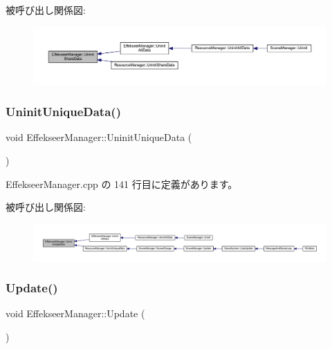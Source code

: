被呼び出し関係図\+:
\nopagebreak
\begin{figure}[H]
\begin{center}
\leavevmode
\includegraphics[width=350pt]{class_effekseer_manager_ab83021d09eeeaba41852c8db2f07fe55_icgraph}
\end{center}
\end{figure}
\mbox{\label{class_effekseer_manager_abd448f6ec39f2306a6dc99b79aff0362}} 
\subsubsection{\texorpdfstring{Uninit\+Unique\+Data()}{UninitUniqueData()}}
{\footnotesize\ttfamily void Effekseer\+Manager\+::\+Uninit\+Unique\+Data (\begin{DoxyParamCaption}{ }\end{DoxyParamCaption})\hspace{0.3cm}{\ttfamily [static]}}



 Effekseer\+Manager.\+cpp の 141 行目に定義があります。

被呼び出し関係図\+:
\nopagebreak
\begin{figure}[H]
\begin{center}
\leavevmode
\includegraphics[width=350pt]{class_effekseer_manager_abd448f6ec39f2306a6dc99b79aff0362_icgraph}
\end{center}
\end{figure}
\mbox{\label{class_effekseer_manager_a2278033d786e1ada0fcaa390a613a8f9}} 
\subsubsection{\texorpdfstring{Update()}{Update()}}
{\footnotesize\ttfamily void Effekseer\+Manager\+::\+Update (\begin{DoxyParamCaption}{ }\end{DoxyParamCaption})\hspace{0.3cm}{\ttfamily [static]}}




